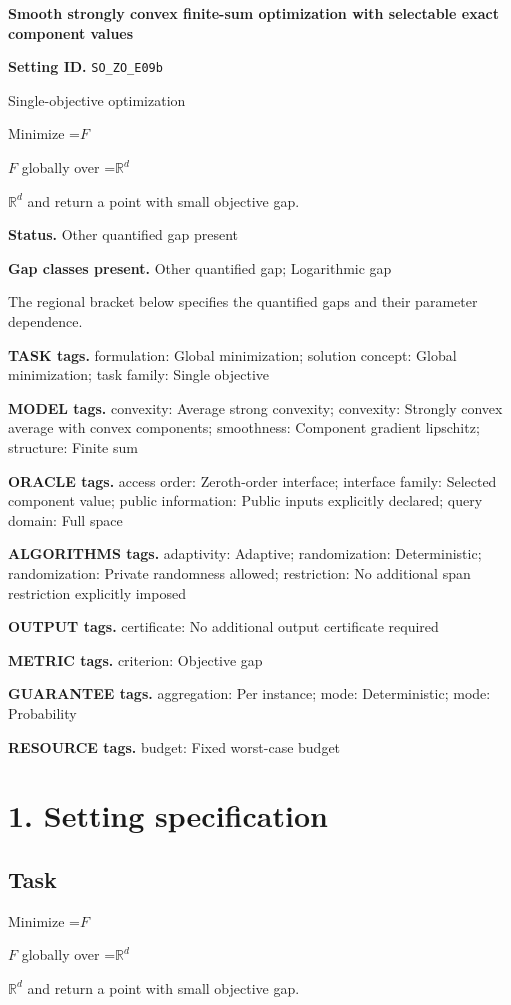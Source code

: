 \documentclass[10pt,a4paper]{article}
\newcommand{\AtlasMath}[1]{\par\begingroup\centering\setbox0=\hbox{$\displaystyle #1$}\ifdim\wd0>1.4\linewidth\typeout{ATLAS WIDE FORMULA: \the\wd0}\fi\ifdim\wd0>\linewidth\resizebox{\linewidth}{!}{\box0}\else\box0\fi\par\endgroup}
\newcommand{\AtlasInlineMath}[1]{\begingroup\setbox0=\hbox{$#1$}\ifdim\wd0>.4\linewidth\endgroup\AtlasMath{#1}\else\endgroup$#1$\fi}
\begin{document}
\raggedright

{\LARGE\bfseries\sffamily\color{AtlasNavy} Smooth strongly convex finite-sum optimization with selectable exact component values\par}\vspace{5pt}
\textbf{Setting ID.} \texttt{SO\_\allowbreak{}ZO\_\allowbreak{}E09b}

Single-objective optimization

Minimize \AtlasInlineMath{F} globally over \AtlasInlineMath{\mathbb{R}^d} and return a point with small objective gap.

\textbf{Status.} Other quantified gap present

\textbf{Gap classes present.} Other quantified gap; Logarithmic gap

The regional bracket below specifies the quantified gaps and their parameter dependence.

\textbf{TASK tags.} formulation: Global minimization; solution concept: Global minimization; task family: Single objective

\textbf{MODEL tags.} convexity: Average strong convexity; convexity: Strongly convex average with convex components; smoothness: Component gradient lipschitz; structure: Finite sum

\textbf{ORACLE tags.} access order: Zeroth-order interface; interface family: Selected component value; public information: Public inputs explicitly declared; query domain: Full space

\textbf{ALGORITHMS tags.} adaptivity: Adaptive; randomization: Deterministic; randomization: Private randomness allowed; restriction: No additional span restriction explicitly imposed

\textbf{OUTPUT tags.} certificate: No additional output certificate required

\textbf{METRIC tags.} criterion: Objective gap

\textbf{GUARANTEE tags.} aggregation: Per instance; mode: Deterministic; mode: Probability

\textbf{RESOURCE tags.} budget: Fixed worst-case budget

\section{1. Setting specification}
\subsection{Task}
Minimize \AtlasInlineMath{F} globally over \AtlasInlineMath{\mathbb{R}^d} and return a point with small objective gap.
\end{document}
